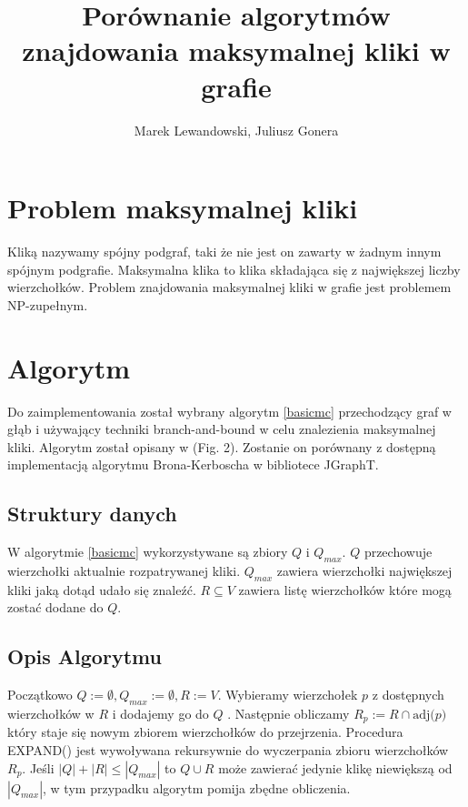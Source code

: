 \documentclass[12pt, a4paper]{article}
\author{Marek Lewandowski, Juliusz Gonera}
\date{}
\title{Porównanie algorytmów znajdowania maksymalnej kliki w grafie}
\begin{document}
\maketitle

\section{Problem maksymalnej kliki}
\label{sec-1}
Kliką nazywamy spójny podgraf, taki że nie jest on zawarty w żadnym innym spójnym podgrafie. Maksymalna klika to klika składająca się z największej liczby wierzchołków. Problem znajdowania maksymalnej kliki w grafie jest problemem NP-zupełnym.

\section{Algorytm}
\label{sec-2}
Do zaimplementowania został wybrany algorytm \ref{basicmc} przechodzący graf w głąb i używający techniki branch-and-bound w celu znalezienia maksymalnej kliki. Algorytm został opisany w \citep{bioinf} (Fig. 2). Zostanie on porównany z dostępną implementacją algorytmu Brona-Kerboscha w bibliotece JGraphT\citep{jgrapht}.

\subsection{Struktury danych}

W algorytmie \ref{basicmc} wykorzystywane są zbiory $Q$ i $Q_{max}$. $Q$ przechowuje wierzchołki aktualnie rozpatrywanej kliki. $Q_{max}$ zawiera wierzchołki największej kliki jaką dotąd udało się znaleźć. $R \subseteq V $ zawiera listę wierzchołków które mogą zostać dodane do $Q$.

\subsection{Opis Algorytmu}

Początkowo $Q := \emptyset, Q_{max} := \emptyset, R := V$. Wybieramy wierzchołek $p$ z dostępnych wierzchołków w $R$ i dodajemy go do $Q$ . Następnie obliczamy $R_{p} := R \cap \text{adj(}p\text{)}$ który staje się nowym zbiorem wierzchołków do przejrzenia. Procedura EXPAND() jest wywoływana rekursywnie do wyczerpania zbioru wierzchołków $R_{p}$. Jeśli $|Q|+|R| \leq |Q_{max}|$ to $Q \cup R$ może zawierać jedynie klikę niewiększą od $|Q_{max}|$, w tym przypadku algorytm pomija zbędne obliczenia.
\end{document}
